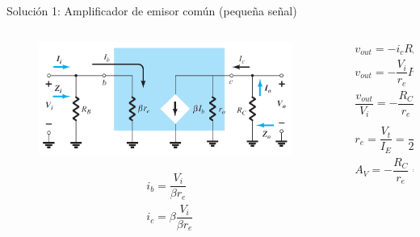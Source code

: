 \documentclass[t,aspectratio=169]{beamer}
\begin{document}
\begin{frame}{Solución 1: Amplificador de emisor común (pequeña señal)}

\begin{columns}
\begin{column}{0.5\textwidth}
%
\begin{figure}[H]
    \centering
    \includegraphics[width=\textwidth]{figuras/analisis_re_ec_3.png}
\end{figure}
%
\begin{align*}
&i_b = \dfrac{V_i}{\beta r_e} \\
&i_c = \beta \dfrac{V_i}{\beta r_e} \\
\end{align*}

\end{column}
\begin{column}{0.5\textwidth}
%
\begin{align*}
&v_{out} = -i_c R_C \\
&v_{out} = - \dfrac{V_i}{r_e} R_C \\
&\dfrac{v_{out}}{V_i} = - \dfrac{R_C}{r_e} \\
\end{align*}
%
\begin{align*}
&r_e = \dfrac{V_t}{I_E} = \dfrac{26\ mV}{2.428\ mV} = 10.708\ \Omega \\
&A_V = - \dfrac{R_C}{r_e} = - \dfrac{3\ k\Omega}{10.708\ \Omega} = -280.2 \\
\end{align*}

\end{column}
\end{columns}

\end{frame}
\end{document}
